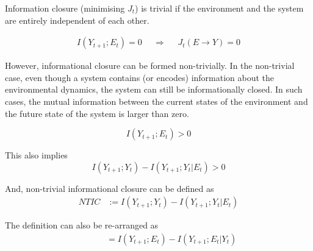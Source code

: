 \documentclass[utf8]{article}
\begin{document}
			\noindent
			Information closure (minimising $J_t$) is trivial if the environment and the system are entirely independent of each other.

				\begin{equation}
				\begin{aligned}
				{I(Y_{t+1};E_{t})=0}&&{\Rightarrow}&&{J_{t}(E \rightarrow Y )=0}
				\end{aligned}
				\end{equation}


			\noindent
			However, informational closure can be formed non-trivially. In the non-trivial case, even though a system contains (or encodes) information about the environmental dynamics, the system can still be informationally closed. In such cases, the mutual information between the current states of the environment and the future state of the system is larger than zero. %

				\begin{equation}
				I(Y_{t+1};E_{t}) > 0
				\end{equation}

			\noindent
			This also implies
				\begin{equation}
					I(Y_{t+1};Y_{t})-I(Y_{t+1};Y_{t}|E_{t}) > 0
				\end{equation}



			\noindent
			And, non-trivial informational closure can be defined as
				\begin{equation}
				\label{eq:NTIC}
    				\left.\begin{array}
    				{rl}{NTIC} & {:=I(Y_{t+1};Y_{t})-I(Y_{t+1};Y_{t}|E_{t})}
    				\end{array} \right.
				\end{equation}
				
				
			\noindent
            The definition can also be re-arranged as 
				\begin{equation}
				\label{eq:NTIC2}
    				\left.\begin{array}
    				{rl}{\qquad} & {\ =I(Y_{t+1};E_{t})-I(Y_{t+1};E_{t}|Y_{t})}
    				\end{array} \right.
				\end{equation}				
\end{document}
